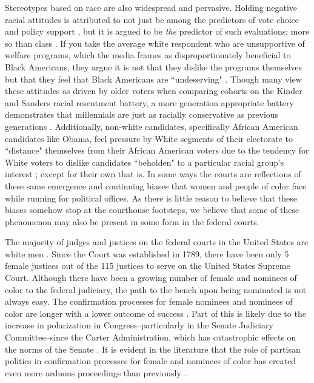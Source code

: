 \documentclass [12pt]{article}
\begin{document}
Stereotypes based on race are also widespread and pervasive. Holding negative racial attitudes is attributed to not just be among the predictors of vote choice and policy support \citep{sides_et-al_2018, gilens_1999}, but it is argued to be \textit{the} predictor of such evaluations; more so than class \citep{hajnal_2020}. If you take the average white respondent who are unsupportive of welfare programs, which the media frames as disproportionately beneficial to Black Americans, they argue it is not that they dislike the programs themselves but that they feel that Black Americans are ``undeserving" \citep{winter_2008}. Though many view these attitudes as driven by older voters when comparing cohorts on the Kinder and Sanders \citeyearpar{kinder_sanders_1996} racial resentment battery, a more generation appropriate battery demonstrates that millennials are just as racially conservative as previous generations \citep{desante_smith_2020_chicago}. Additionally, non-white candidates, specifically African American candidates like Obama, feel pressure by White segments of their electorate to ``distance" themselves from their African American voters due to the tendency for White voters to dislike candidates ``beholden" to a particular racial group's interest \citep{stephens-dougan_2020}; except for their own that is. In some ways the courts are reflections of these same emergence and continuing biases that women and people of color face while running for political offices. As there is little reason to believe that these biases somehow stop at the courthouse footsteps, we believe that some of these phenomenon may also be present in some form in the federal courts.

The majority of judges and justices on the federal courts in the United States are white men \citep{kastellec_2013}. Since the Court was established in 1789, there have been only 5 female justices out of the 115 justices to serve on the United States Supreme Court. Although there have been a growing number of female and nominees of color to the federal judiciary, the path to the bench upon being nominated is not always easy. The confirmation processes for female nominees and nominees of color are longer with a lower outcome of success \citep{asmussen_2011}. Part of this is likely due to the increase in polarization in Congress--particularly in the Senate Judiciary Committee--since the Carter Administration, which has catastrophic effects on the norms of the Senate \citep{owens_2018, mccarty_et-al_2005}. It is evident in the literature that the role of partisan politics in confirmation processes for female and nominees of color has created even more arduous proceedings than previously \citep{solowiej_2005}. 
\end{document}

